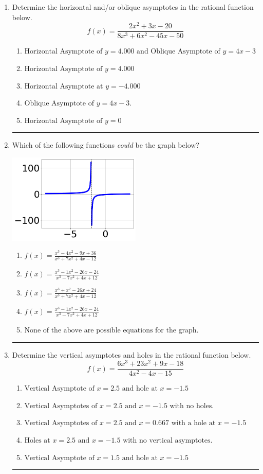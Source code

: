 \documentclass[14pt]{extbook}
\newcommand{\litem}[1]{\item#1\hspace*{-1cm}\rule{\textwidth}{0.4pt}}
\begin{document}
\begin{enumerate}
{\begin{enumerate}[label=\Alph*.]
\end{enumerate} }
\litem{
Determine the horizontal and/or oblique asymptotes in the rational function below.\[ f(x) = \frac{2x^{2} +3 x -20}{8x^{3} +6 x^{2} -45 x -50} \]\begin{enumerate}[label=\Alph*.]
\item \( \text{Horizontal Asymptote of } y = 4.000 \text{ and Oblique Asymptote of } y = 4x -3 \)
\item \( \text{Horizontal Asymptote of } y = 4.000  \)
\item \( \text{Horizontal Asymptote at } y = -4.000 \)
\item \( \text{Oblique Asymptote of } y = 4x -3. \)
\item \( \text{Horizontal Asymptote of } y = 0 \)

\end{enumerate} }
\litem{
Which of the following functions \textit{could} be the graph below?
\begin{center}
    \includegraphics[width=0.5\textwidth]{../Figures/identifyGraphOfRationalFunctionCopyB.png}
\end{center}
\begin{enumerate}[label=\Alph*.]
\item \( f(x)=\frac{x^{3} -4 x^{2} -9 x + 36}{x^{3} +7 x^{2} +4 x -12} \)
\item \( f(x)=\frac{x^{3} -1 x^{2} -26 x -24}{x^{3} -7 x^{2} +4 x + 12} \)
\item \( f(x)=\frac{x^{3} + x^{2} -26 x + 24}{x^{3} +7 x^{2} +4 x -12} \)
\item \( f(x)=\frac{x^{3} -1 x^{2} -26 x -24}{x^{3} -7 x^{2} +4 x + 12} \)
\item \( \text{None of the above are possible equations for the graph.} \)

\end{enumerate} }
\litem{
Determine the vertical asymptotes and holes in the rational function below.\[ f(x) = \frac{6x^{3} +23 x^{2} +9 x -18}{4x^{2} -4 x -15} \]\begin{enumerate}[label=\Alph*.]
\item \( \text{Vertical Asymptote of } x = 2.5 \text{ and hole at } x = -1.5 \)
\item \( \text{Vertical Asymptotes of } x = 2.5 \text{ and } x = -1.5 \text{ with no holes.} \)
\item \( \text{Vertical Asymptotes of } x = 2.5 \text{ and } x = 0.667 \text{ with a hole at } x = -1.5 \)
\item \( \text{Holes at } x = 2.5 \text{ and } x = -1.5 \text{ with no vertical asymptotes.} \)
\item \( \text{Vertical Asymptote of } x = 1.5 \text{ and hole at } x = -1.5 \)


\end{enumerate}}
\end{enumerate}
\end{document}
